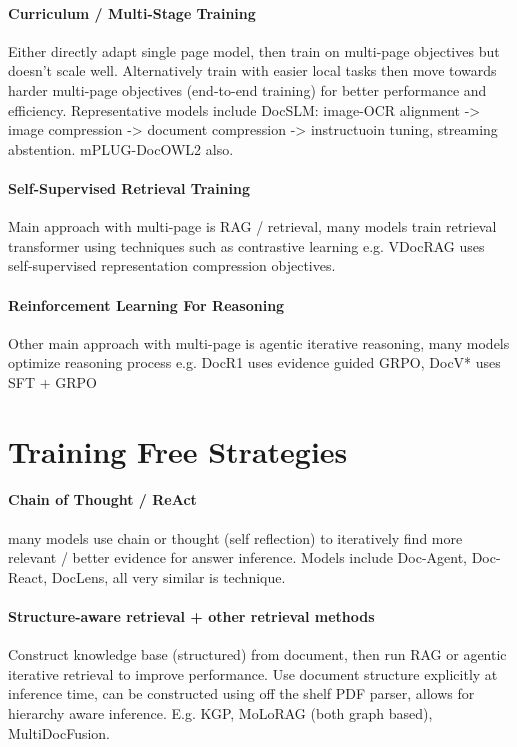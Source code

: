 \documentclass[11pt]{article}
\begin{document}
\paragraph{Curriculum / Multi-Stage Training}
Either directly adapt single page model, then train on multi-page objectives but doesn't scale well.
Alternatively train with easier local tasks then move towards harder multi-page objectives (end-to-end training) for better performance and efficiency.
Representative models include DocSLM: image-OCR alignment -> image compression -> document compression -> instructuoin tuning, streaming abstention.
mPLUG-DocOWL2 also.

\paragraph{Self-Supervised Retrieval Training}
Main approach with multi-page is RAG / retrieval, many models train retrieval transformer using techniques such as contrastive learning e.g. VDocRAG uses self-supervised representation compression objectives. 

\paragraph{Reinforcement Learning For Reasoning}
Other main approach with multi-page is agentic iterative reasoning, many models optimize reasoning process e.g. DocR1 uses evidence guided GRPO, DocV* uses SFT + GRPO

\section{Training Free Strategies}

\paragraph{Chain of Thought / ReAct}
many models use chain or thought (self reflection) to iteratively find more relevant / better evidence for answer inference. 
Models include Doc-Agent, Doc-React, DocLens, all very similar is technique.

\paragraph{Structure-aware retrieval + other retrieval methods}
Construct knowledge base (structured) from document, then run RAG or agentic iterative retrieval to improve performance. Use document structure explicitly at inference time, can be constructed using off the shelf PDF parser, allows for hierarchy aware inference. E.g. KGP, MoLoRAG (both graph based), MultiDocFusion.
\end{document}
